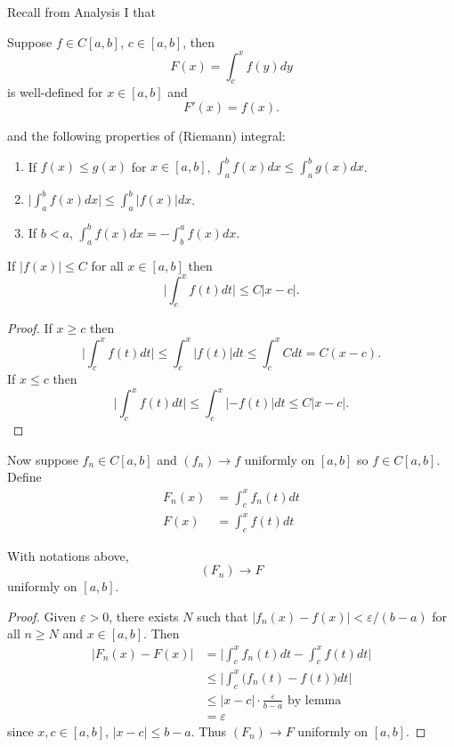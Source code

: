 \documentclass[a4paper]{article}
\theoremstyle{definition}
\begin{document}
Recall from Analysis I that
\begin{theorem}
  \label{thm:FTC}
  Suppose \(f\in C[a,b]\), \(c\in [a,b]\), then
  \[
    F(x) = \int_{c}^{x} f(y) dy
  \]
  is well-defined for \(x\in[a,b]\) and
  \[
    F'(x) = f(x).
  \]
\end{theorem}
and the following properties of (Riemann) integral:
\begin{enumerate}
\item If \(f(x) \leq g(x) \) for \(x\in[a,b]\), \(\int_{a}^{b} f(x) dx \leq \int_{a}^{b} g(x) dx \).
\item \(\big|\int_{a}^{b} f(x) dx \big| \leq \int_{a}^{b} |f(x)| dx \).
\item If \(b<a\), \(\int_{a}^{b} f(x) dx = - \int_{b}^{a} f(x) dx \).
\end{enumerate}

\begin{lemma}
  If \(|f(x)|\leq C\) for all \(x\in[a,b]\) then
  \[
    \Big| \int_{c}^{x} f(t) dt \Big| \leq C|x-c|.
  \]
\end{lemma}

\begin{proof}
  If \(x\geq c\) then
  \[
    \Big| \int_{c}^{x} f(t) dt \Big| \leq \int_{c}^{x} |f(t)| dt \leq \int_{c}^{x} C dt = C(x-c).
  \]
  If \(x\leq c\) then
   \[
    \Big| \int_{c}^{x} f(t) dt \Big| \leq \int_{c}^{x} |-f(t)| dt \leq C|x-c|.
  \]
\end{proof}

Now suppose \(f_n\in C[a,b]\) and \((f_n)\to f\) uniformly on \([a,b]\) so \(f\in C[a,b]\). Define
\begin{align*}
  F_n(x) &= \int_{c}^{x} f_n(t) dt \\
  F(x) &= \int_{c}^{x} f(t) dt
\end{align*}

\begin{proposition}
  \label{prop:power series integral convergence}
  With notations above,
  \[
    (F_n) \to F
  \]
  uniformly on \([a,b]\).
\end{proposition}

\begin{proof}
  Given \(\varepsilon>0\), there exists \(N\) such that \(|f_n(x) - f(x)| < \varepsilon/(b-a)\) for all \(n\geq N\) and \(x\in[a,b]\). Then
  \begin{align*}
    |F_n(x) - F(x)| &= \Big| \int_{c}^{x} f_n(t) dt - \int_{c}^{x} f(t) dt \Big| \\
                    &\leq \Big| \int_{c}^{x} \big( f_n(t) - f(t) \big) dt \Big| \\
                    &\leq |x-c| \cdot\frac{\varepsilon}{b-a} \text{ by lemma} \\
                    &= \varepsilon
  \end{align*}
  since \(x,c\in[a,b]\), \(|x-c|\leq b-a\). Thus \((F_n)\to F\) uniformly on \([a,b]\).
\end{proof}
\end{document}
